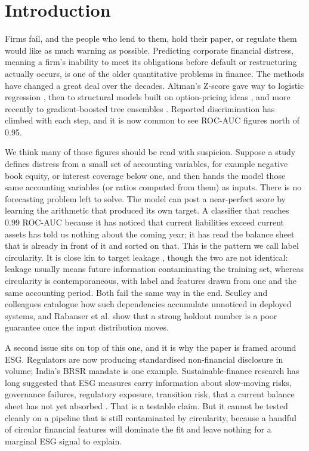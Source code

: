 \documentclass[conference]{IEEEtran}
\begin{document}
\section{Introduction}

Firms fail, and the people who lend to them, hold their paper, or regulate them
would like as much warning as possible. Predicting corporate financial
distress, meaning a firm's inability to meet its obligations before default or
restructuring actually occurs, is one of the older quantitative problems in
finance. The methods have changed a great deal over the decades. Altman's
Z-score \cite{altman1968} gave way to logistic regression \cite{ohlson1980},
then to structural models built on option-pricing ideas \cite{merton1974}, and
more recently to gradient-boosted tree ensembles \cite{chen2016,ke2017}. Reported
discrimination has climbed with each step, and it is now common to see ROC-AUC
figures north of 0.95.

We think many of those figures should be read with suspicion. Suppose a study
defines distress from a small set of accounting variables, for example negative
book equity, or interest coverage below one, and then hands the model those same
accounting variables (or ratios computed from them) as inputs. There is no
forecasting problem left to solve. The model can post a near-perfect score by
learning the arithmetic that produced its own target. A classifier that reaches
0.99 ROC-AUC because it has noticed that current liabilities exceed current
assets has told us nothing about the coming year; it has read the balance sheet
that is already in front of it and sorted on that. This is the pattern we call
label circularity. It is close kin to target leakage \cite{sculley2015}, though
the two are not identical: leakage usually means future information contaminating
the training set, whereas circularity is contemporaneous, with label and
features drawn from one and the same accounting period. Both fail the same way in
the end. Sculley and colleagues \cite{sculley2015} catalogue how such
dependencies accumulate unnoticed in deployed systems, and Rabanser et al.
\cite{rabanser2019} show that a strong holdout number is a poor guarantee once
the input distribution moves.

A second issue sits on top of this one, and it is why the paper is framed around
ESG. Regulators are now producing standardised non-financial disclosure in
volume; India's BRSR mandate is one example. Sustainable-finance research has
long suggested that ESG measures carry information about slow-moving risks,
governance failures, regulatory exposure, transition risk, that a current
balance sheet has not yet absorbed \cite{friede2015}. That is a testable claim.
But it cannot be tested cleanly on a pipeline that is still contaminated by
circularity, because a handful of circular financial features will dominate the
fit and leave nothing for a marginal ESG signal to explain.
\end{document}
